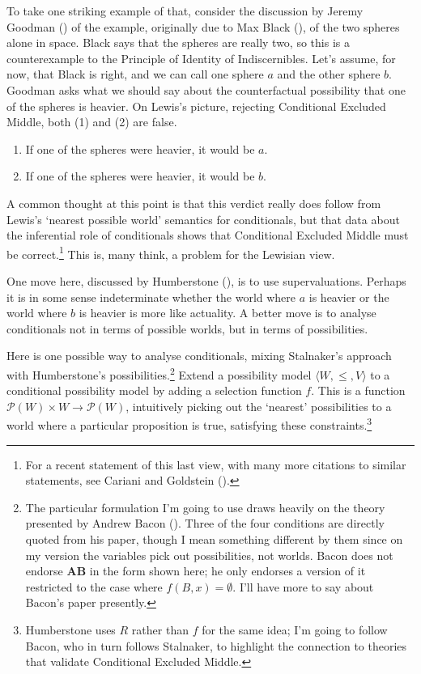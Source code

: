 \documentclass[
  11pt,
  letterpaper,
  DIV=11,
  numbers=noendperiod,
  twoside]{scrartcl}
\providecommand{\tightlist}{%
  \setlength{\itemsep}{0pt}\setlength{\parskip}{0pt}}
\begin{document}
To take one striking example of that, consider the discussion by Jeremy
Goodman () of the example, originally due
to Max Black (), of the two spheres alone
in space. Black says that the spheres are really two, so this is a
counterexample to the Principle of Identity of Indiscernibles. Let's
assume, for now, that Black is right, and we can call one sphere \(a\)
and the other sphere \(b\). Goodman asks what we should say about the
counterfactual possibility that one of the spheres is heavier. On
Lewis's picture, rejecting Conditional Excluded Middle, both (1) and (2)
are false.

\begin{enumerate}
\def\labelenumi{(\arabic{enumi})}
\tightlist
\item
  If one of the spheres were heavier, it would be \(a\).
\item
  If one of the spheres were heavier, it would be \(b\).
\end{enumerate}

A common thought at this point is that this verdict really does follow
from Lewis's `nearest possible world' semantics for conditionals, but
that data about the inferential role of conditionals shows that
Conditional Excluded Middle must be correct.\footnote{For a recent
  statement of this last view, with many more citations to similar
  statements, see Cariani and Goldstein
  ().} This is, many think, a
problem for the Lewisian view.

One move here, discussed by Humberstone
(), is to use supervaluations.
Perhaps it is in some sense indeterminate whether the world where \(a\)
is heavier or the world where \(b\) is heavier is more like actuality. A
better move is to analyse conditionals not in terms of possible worlds,
but in terms of possibilities.

Here is one possible way to analyse conditionals, mixing Stalnaker's
approach with Humberstone's possibilities.\footnote{The particular
  formulation I'm going to use draws heavily on the theory presented by
  Andrew Bacon (). Three of the four
  conditions are directly quoted from his paper, though I mean something
  different by them since on my version the variables pick out
  possibilities, not worlds. Bacon does not endorse \textbf{AB} in the
  form shown here; he only endorses a version of it restricted to the
  case where \(f(B, x) = \emptyset\). I'll have more to say about
  Bacon's paper presently.} Extend a possibility model
\(\langle W, \leqslant, V \rangle\) to a conditional possibility model
by adding a selection function \(f\). This is a function
\(\mathcal{P}(W) \times W \rightarrow \mathcal{P}(W)\), intuitively
picking out the `nearest' possibilities to a world where a particular
proposition is true, satisfying these constraints.\footnote{Humberstone
  uses \(R\) rather than \(f\) for the same idea; I'm going to follow
  Bacon, who in turn follows Stalnaker, to highlight the connection to
  theories that validate Conditional Excluded Middle.}
\end{document}
